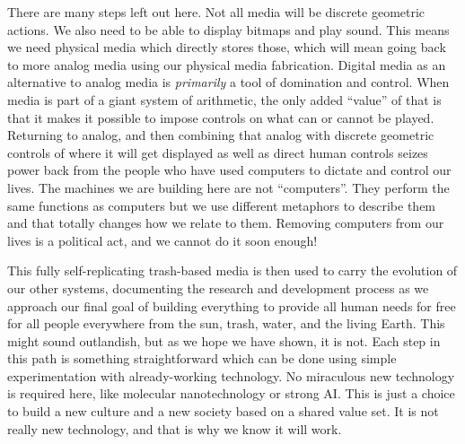 There are many steps left out here. Not all media will be discrete
geometric actions. We also need to be able to display bitmaps and play
sound. This means we need physical media which directly stores those,
which will mean going back to more analog media using our physical media
fabrication. Digital media as an alternative to analog media is
\emph{primarily} a tool of domination and control. When media is part of
a giant system of arithmetic, the only added ``value'' of that is that
it makes it possible to impose controls on what can or cannot be played.
Returning to analog, and then combining that analog with discrete
geometric controls of where it will get displayed as well as direct
human controls seizes power back from the people who have used computers
to dictate and control our lives. The machines we are building here are
not ``computers''. They perform the same functions as computers but we
use different metaphors to describe them and that totally changes how we
relate to them. Removing computers from our lives is a political act,
and we cannot do it soon enough!

This fully self-replicating trash-based media is then used to carry the
evolution of our other systems, documenting the research and development
process as we approach our final goal of building everything to provide
all human needs for free for all people everywhere from the sun, trash,
water, and the living Earth. This might sound outlandish, but as we hope
we have shown, it is not. Each step in this path is something
straightforward which can be done using simple experimentation with
already-working technology. No miraculous new technology is required
here, like molecular nanotechnology or strong AI. This is just a choice
to build a new culture and a new society based on a shared value set. It
is not really new technology, and that is why we know it will work.
